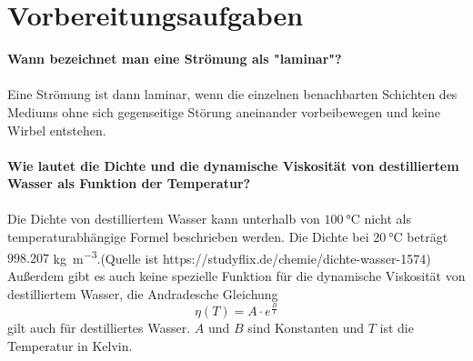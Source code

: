 \section{Vorbereitungsaufgaben}
\label{sec:Vorbereitungsaufgaben}
\textbf{Wann bezeichnet man eine Strömung als "laminar"?}\\
\\
Eine Strömung ist dann laminar, wenn die einzelnen benachbarten Schichten 
des Mediums ohne sich gegenseitige Störung aneinander vorbeibewegen und 
keine Wirbel entstehen. \\ 
\\
%
\textbf{Wie lautet die Dichte und die dynamische Viskosität von 
destilliertem Wasser als Funktion der Temperatur?}\\
\\
Die Dichte von destilliertem Wasser kann unterhalb von  
$\SI{100}{\celsius}$ nicht als temperaturabhängige Formel 
beschrieben werden.
Die Dichte bei $\SI{20}{\celsius}$ beträgt $998.207$ 
\unit[per-mode=fraction]{\kilo\gram\per\meter\tothe{3}}.(Quelle ist https://studyflix.de/chemie/dichte-wasser-1574)
Außerdem gibt es auch keine spezielle Funktion für die dynamische
Viskosität von destilliertem Wasser, die Andradesche Gleichung 
\begin{equation}
 \eta (T) = A \cdot e^{\frac{B}{T}}
 \label{equ:AndradescheGleichung}
\end{equation} 
gilt auch für destilliertes Wasser. $A$ und $B$ sind Konstanten und $T$ ist die Temperatur in Kelvin. 
